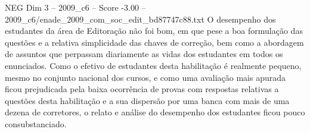 \begin{textsample}{NEG Dim 3 – 2009\_c6 – Score -3.00 – 2009\_c6/enade\_2009\_com\_soc\_edit\_bd87747c88.txt}
O desempenho dos estudantes da área de Editoração não foi bom, em que pese a boa formulação das questões e a relativa simplicidade das chaves de correção, bem como a abordagem de assuntos que perpassam diariamente as vidas dos estudantes em todos os enunciados.
Como o efetivo de estudantes desta habilitação é realmente pequeno, mesmo no conjunto nacional dos cursos, e como uma avaliação mais apurada ficou prejudicada pela baixa ocorrência de provas com respostas relativas a questões desta habilitação e a sua dispersão por uma banca com mais de uma dezena de corretores, o relato e análise do desempenho dos estudantes ficou pouco consubstanciado.

\end{textsample}
